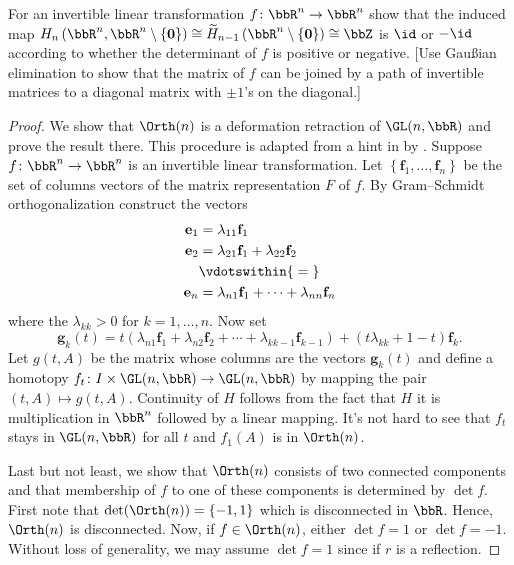 \begin{problem}[Hatcher {\S}2.2, Ex.\@ 7]
For an invertible linear transformation $f\colon\bbR^n\to\bbR^n$ show that
the induced map
$H_n\left(\bbR^n,\bbR^n\setminus\{\mathbf{0}\}\right)\cong\widetilde
H_{n-1}\left(\bbR^n\setminus\{\mathbf{0}\}\right)\cong\bbZ$ is $\id$ or $-\id$
according to whether the determinant of $f$ is positive or negative. [Use
Gaußian elimination to show that the matrix of $f$ can be joined by a path
of invertible matrices to a diagonal matrix with $\pm 1$'s on the
diagonal.]
\end{problem}
\begin{proof}
We show that $\Orth(n)$ is a deformation retraction of $\GL(n,\bbR)$
and prove the result there. This procedure is adapted from a hint in
\emph{} by . Suppose $f\colon\bbR^n\to\bbR^n$ is
an invertible linear transformation. Let
$\left\{\mathbf{f}_1,\dotsc,\mathbf{f}_n\right\}$ be the set of columns
vectors of the matrix representation $F$ of $f$. By
Gram--Schmidt orthogonalization construct the vectors
\begin{equation}
\label{eq:gram-schmidt-orth}
\begin{aligned}
\mathbf{e}_1&=\lambda_{11}\mathbf{f}_1\\
\mathbf{e}_2&=\lambda_{21}\mathbf{f}_1+\lambda_{22}\mathbf{f}_2\\
&\vdotswithin{{}={}}\\
\mathbf{e}_n&=\lambda_{n1}\mathbf{f}_1+\dotsb+\lambda_{nn}\mathbf{f}_n
\end{aligned}
\end{equation}
where the $\lambda_{kk}>0$ for $k=1,\dotsc,n$. Now set
\begin{equation}
\label{eq:vectors-as-function-of-t}
\mathbf{g}_k(t)=
t\left(\lambda_{n1}\mathbf{f}_1+\lambda_{n2}\mathbf{f}_2+\dotsb+\lambda_{kk-1}\mathbf{f}_{k-1}\right)+(t\lambda_{kk}+1-t)\mathbf{f}_k.
\end{equation}
Let $g(t,A)$ be the matrix whose columns are the vectors $\mathbf{g}_k(t)$
and define a homotopy $f_t\colon I\times\GL(n,\bbR)\to\GL(n,\bbR)$ by mapping
the pair $(t,A)\mapsto g(t,A)$. Continuity of $H$ follows from the fact
that $H$ it is multiplication in $\bbR^n$ followed by a linear
mapping. It's not hard to see that $f_t$ stays in $\GL(n,\bbR)$ for all $t$
and $f_1(A)$ is in $\Orth(n)$.

Last but not least, we show that $\Orth(n)$ consists of two connected
components and that membership of $f$ to one of these components is
determined by $\det f$. First note that
$\det(\Orth(n))=\{-1,1\}$ which is disconnected in
$\bbR$. Hence, $\Orth(n)$ is disconnected. Now, if
$f\in\Orth(n)$, either $\det f=1$ or $\det f=-1$. Without loss of
generality, we may assume $\det f=1$ since if $r$ is a reflection.


\end{proof}
